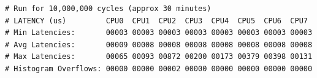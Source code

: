 \begin{lstlisting}[caption={Ubuntu20 HP-Laptop-02 CPU Performance}, label=tab-Ubuntu20 HP-Laptop-02 CPU Performance]	
# Run for 10,000,000 cycles (approx 30 minutes)
# LATENCY (us)         CPU0  CPU1  CPU2  CPU3  CPU4  CPU5  CPU6  CPU7
# Min Latencies:       00003 00003 00003 00003 00003 00003 00003 00003
# Avg Latencies:       00009 00008 00008 00008 00008 00008 00008 00008
# Max Latencies:       00065 00093 00872 00200 00173 00379 00398 00131
# Histogram Overflows: 00000 00000 00002 00000 00000 00000 00000 00000
\end{lstlisting}

\clearpage
\pagebreak

